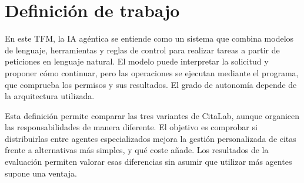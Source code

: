 \section{Definición de trabajo}

En este TFM, la IA agéntica se entiende como un sistema que combina modelos de lenguaje, herramientas y reglas de control para realizar tareas a partir de peticiones en lenguaje natural. El modelo puede interpretar la solicitud y proponer cómo continuar, pero las operaciones se ejecutan mediante el programa, que comprueba los permisos y sus resultados. El grado de autonomía depende de la arquitectura utilizada.

Esta definición permite comparar las tres variantes de CitaLab, aunque organicen las responsabilidades de manera diferente. El objetivo es comprobar si distribuirlas entre agentes especializados mejora la gestión personalizada de citas frente a alternativas más simples, y qué coste añade. Los resultados de la evaluación permiten valorar esas diferencias sin asumir que utilizar más agentes supone una ventaja.
